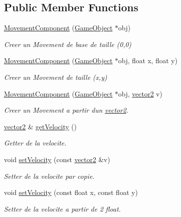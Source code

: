 \subsection*{Public Member Functions}
\begin{DoxyCompactItemize}
\item 
\hypertarget{class_movement_component_abedebd5453aa86cf8a1cd7449990e16f}{}\label{class_movement_component_abedebd5453aa86cf8a1cd7449990e16f} 
\hyperlink{class_movement_component_abedebd5453aa86cf8a1cd7449990e16f}{Movement\+Component} (\hyperlink{class_game_object}{Game\+Object} $\ast$obj)
\begin{DoxyCompactList}\small\item\em Creer un Movement de base de taille (0,0) \end{DoxyCompactList}\item 
\hyperlink{class_movement_component_a16ae8e5bac9a7f101fc18c26ba025e52}{Movement\+Component} (\hyperlink{class_game_object}{Game\+Object} $\ast$obj, float x, float y)
\begin{DoxyCompactList}\small\item\em Creer un Movement de taille (x,y) \end{DoxyCompactList}\item 
\hyperlink{class_movement_component_a2cfc3e6dbe3cda60f8dc4d0694494f87}{Movement\+Component} (\hyperlink{class_game_object}{Game\+Object} $\ast$obj, \hyperlink{structvector2}{vector2} v)
\begin{DoxyCompactList}\small\item\em Creer un Movement a partir d\textquotesingle{}un \hyperlink{structvector2}{vector2}. \end{DoxyCompactList}\item 
\hyperlink{structvector2}{vector2} \& \hyperlink{class_movement_component_a1b3cc0445b34ceafb79d694ecafbcd2c}{get\+Velocity} ()
\begin{DoxyCompactList}\small\item\em Getter de la velocite. \end{DoxyCompactList}\item 
void \hyperlink{class_movement_component_a713784d4a7ccca4e4ad946f73d2db6cd}{set\+Velocity} (const \hyperlink{structvector2}{vector2} \&v)
\begin{DoxyCompactList}\small\item\em Setter de la velocite par copie. \end{DoxyCompactList}\item 
void \hyperlink{class_movement_component_add7629692ed68862ff1fd1f3515e2ea6}{set\+Velocity} (const float x, const float y)
\begin{DoxyCompactList}\small\item\em Setter de la velocite a partir de 2 float. \end{DoxyCompactList}\end{DoxyCompactItemize}
